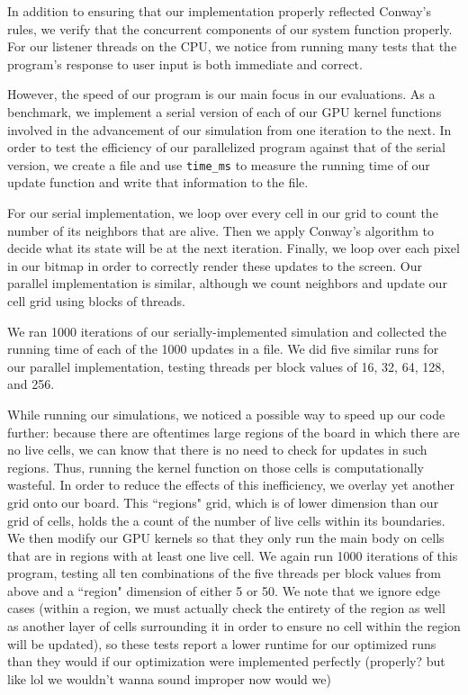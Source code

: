 \documentclass[12pt]{article}
\begin{document}
    In addition to ensuring that our implementation properly reflected Conway's rules, we verify that the concurrent components of our system function properly. For our listener threads on the CPU, we notice from running many tests that the program's response to user input is both immediate and correct. 
    
    However, the speed of our program is our main focus in our evaluations. As a benchmark, we implement a serial version of each of our GPU kernel functions involved in the advancement of our simulation from one iteration to the next. In order to test the efficiency of our parallelized program against that of the serial version, we create a file and use \texttt{time\_ms} to measure the running time of our update function and write that information to the file. 
    
    For our serial implementation, we loop over every cell in our grid to count the number of its neighbors that are alive. Then we apply Conway's algorithm to decide what its state will be at the next iteration. Finally, we loop over each pixel in our bitmap in order to correctly render these updates to the screen. Our parallel implementation is similar, although we count neighbors and update our cell grid using blocks of threads. 

    We ran 1000 iterations of our serially-implemented simulation and collected the running time of each of the 1000 updates in a file. We did five similar runs for our parallel implementation, testing threads per block values of 16, 32, 64, 128, and 256.

    While running our simulations, we noticed a possible way to speed up our code further: because there are oftentimes large regions of the board in which there are no live cells, we can know that there is no need to check for updates in such regions. Thus, running the kernel function on those cells is computationally wasteful. In order to reduce the effects of this inefficiency, we overlay yet another grid onto our board. This ``regions" grid, which is of lower dimension than our grid of cells, holds the a count of the number of live cells within its boundaries. We then modify our GPU kernels so that they only run the main body on cells that are in regions with at least one live cell. We again run 1000 iterations of this program, testing all ten combinations of the five threads per block values from above and a ``region" dimension of either 5 or 50. We note that we ignore edge cases (within a region, we must actually check the entirety of the region as well as another layer of cells surrounding it in order to ensure no cell within the region will be updated), so these tests report a lower runtime for our optimized runs than they would if our optimization were implemented perfectly (properly? but like lol we wouldn't wanna sound improper now would we)
\end{document}
